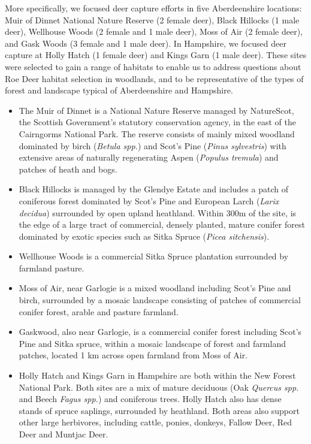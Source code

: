 \documentclass[10pt,a4paper]{article}
\begin{document}
More specifically, we focused deer capture efforts in five Aberdeenshire locations: Muir of Dinnet National Nature Reserve (2 female deer), Black Hillocks (1 male deer), Wellhouse Woods (2 female and 1 male deer), Moss of Air (2 female deer), and Gask Woods (3 female and 1 male deer).
In Hampshire, we focused deer capture at Holly Hatch (1 female deer) and Kings Garn (1 male deer).
These sites were selected to gain a range of habitats to enable us to address questions about Roe Deer habitat selection in woodlands, and to be representative of the types of forest and landscape typical of Aberdeenshire and Hampshire.

\begin{itemize}
\item
  The Muir of Dinnet is a National Nature Reserve managed by NatureScot, the Scottish Government's statutory conservation agency, in the east of the Cairngorms National Park.
  The reserve consists of mainly mixed woodland dominated by birch (\emph{Betula spp.}) and Scot's Pine (\emph{Pinus sylvestris}) with extensive areas of naturally regenerating Aspen (\emph{Populus tremula}) and patches of heath and bogs.
\item
  Black Hillocks is managed by the Glendye Estate and includes a patch of coniferous forest dominated by Scot's Pine and European Larch (\emph{Larix decidua}) surrounded by open upland heathland.
  Within 300m of the site, is the edge of a large tract of commercial, densely planted, mature conifer forest dominated by exotic species such as Sitka Spruce (\emph{Picea sitchensis}).
\item
  Wellhouse Woods is a commercial Sitka Spruce plantation surrounded by farmland pasture.
\item
  Moss of Air, near Garlogie is a mixed woodland including Scot's Pine and birch, surrounded by a mosaic landscape consisting of patches of commercial conifer forest, arable and pasture farmland.
\item
  Gaskwood, also near Garlogie, is a commercial conifer forest including Scot's Pine and Sitka spruce, within a mosaic landscape of forest and farmland patches, located 1 km across open farmland from Moss of Air.
\item
  Holly Hatch and Kings Garn in Hampshire are both within the New Forest National Park.
  Both sites are a mix of mature deciduous (Oak \emph{Quercus spp.} and Beech \emph{Fagus spp.}) and coniferous trees.
  Holly Hatch also has dense stands of spruce saplings, surrounded by heathland.
  Both areas also support other large herbivores, including cattle, ponies, donkeys, Fallow Deer, Red Deer and Muntjac Deer.
\end{itemize}
\end{document}
